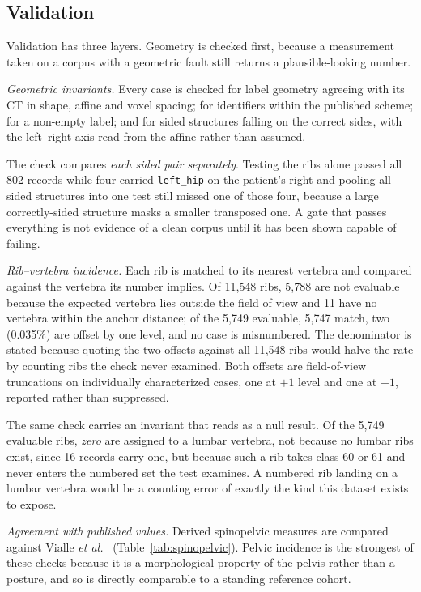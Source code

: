 \documentclass[aapm,mph,amsmath,amssymb,reprint]{revtex4-2}
\begin{document}
\subsection{Validation}
\label{sec:validation}


Validation has three layers. Geometry is checked first, because a measurement taken on a corpus with a geometric fault still returns a plausible-looking number.

\emph{Geometric invariants.} Every case is checked for label geometry agreeing with its CT
in shape, affine and voxel spacing; for identifiers within the published scheme; for a
non-empty label; and for sided structures falling on the correct sides, with the left--right
axis read from the affine rather than assumed. 

The check compares \emph{each sided pair separately}. Testing the ribs alone passed all
802 records while four carried \texttt{left\_hip} on the patient's right and pooling all
sided structures into one test still missed one of those four, because a large
correctly-sided structure masks a smaller transposed one. A gate that passes everything is
not evidence of a clean corpus until it has been shown capable of failing.

\emph{Rib--vertebra incidence.} Each rib is matched to its nearest vertebra and compared
against the vertebra its number implies. Of 11{,}548 ribs, 5{,}788 are not evaluable
because the expected vertebra lies outside the field of view and 11 have no vertebra within
the anchor distance; of the 5{,}749 evaluable, 5{,}747 match, two (0.035\%) are offset by one
level, and no case is misnumbered. The denominator is stated because quoting the two
offsets against all 11{,}548 ribs would halve the rate by counting ribs the check never
examined. Both offsets are field-of-view truncations on individually characterized cases,
one at $+1$ level and one at $-1$, reported rather than suppressed.

The same check carries an invariant that reads as a null result. Of the 5{,}749 evaluable
ribs, \emph{zero} are assigned to a lumbar vertebra, not because no lumbar ribs exist,
since 16 records carry one, but because such a rib takes class 60 or 61 and never enters the
numbered set the test examines. A numbered rib landing on a lumbar vertebra would be a
counting error of exactly the kind this dataset exists to expose.

\emph{Agreement with published values.} Derived spinopelvic measures are compared against
Vialle \emph{et al.}~\cite{vialle2005} (Table~\ref{tab:spinopelvic}). Pelvic incidence is
the strongest of these checks because it is a morphological property of the pelvis rather
than a posture, and so is directly comparable to a standing reference cohort.
\end{document}
